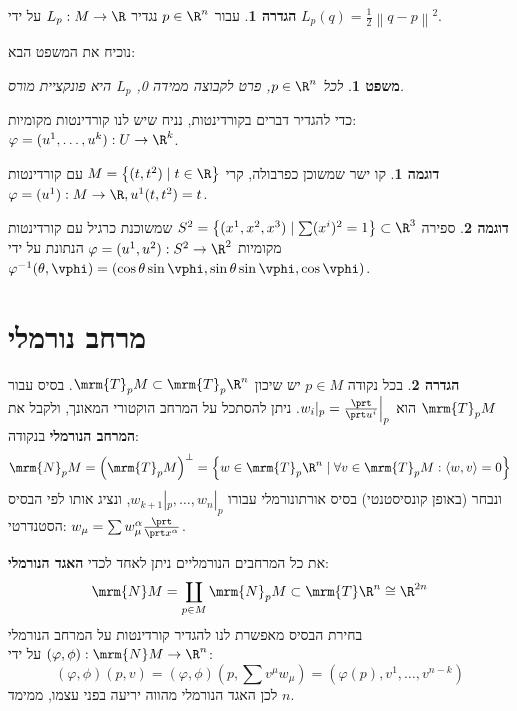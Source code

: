 \documentclass{article}
\newtheorem{theorem}{משפט}
\theoremstyle{definition}
\newtheorem*{definition*}{הגדרה}
\newtheorem*{example*}{דוגמה}
\newcommand{\norm}[1]{\left\lVert#1\right\rVert}
\begin{document}
	\begin{definition*}
		עבור
		\(p\in \R^n\)
		נגדיר
		\(L_p:M\to \R\)
		על ידי
		\(L_p(q)=\frac{1}{2}\norm{q-p}^2\).
	\end{definition*}

	נוכיח את המשפט הבא:
	\begin{theorem}\label{main-thm}
		לכל
		\(p\in \R^n\),
		פרט לקבוצה ממידה 0, \(L_p\) היא פונקציית מורס.
	\end{theorem}

	כדי להגדיר דברים בקורדינטות, נניח שיש לנו קורדינטות מקומיות:
	\(\varphi=(u^1,\dotsc,u^k): U \to \R^k\).
	
	\begin{example*}
		קו ישר שמשוכן כפרבולה, קרי
		\(M = \left\{ (t,t^2)\mid t \in \R \right\}\)
		עם קורדינטות
		\(\varphi=(u^1): M \to \R, u^1(t,t^2)=t\).
	\end{example*}
	
	\begin{example*}
		ספירה
		\(S^2 = \left\{(x^1,x^2,x^3) \mid \sum (x^i)^2 = 1 \right\} \subset \R^3 \)
		שמשוכנת כרגיל עם קורדינטות מקומיות
		\(\varphi=(u^1,u^2): S^2 \to \R^2\)
		הנתונת על ידי
		\(
			\varphi^{-1}(\theta, \vphi) = \left(
				\cos\theta \sin\vphi,
				\sin\theta \sin\vphi,
				\cos\vphi
			\right)
		\).
	\end{example*}




	\section{מרחב נורמלי}
	
	\begin{definition*}
		בכל נקודה
		$p\in M$
		יש שיכון
		\(\mrm{T}_p M \subset \mrm{T}_p \R^n\).
		בסיס עבור
		\(\mrm{T}_p M\)
		הוא
		\(w_i|_p=\frac{\prt}{\prt u^i}\Big|_p\).
		ניתן להסתכל על המרחב הוקטורי המאונך, ולקבל את \textbf{המרחב הנורמלי} בנקודה:
		\[
			\mrm{N}_p M
			= \left(\mrm{T}_p M\right)^\bot
			= \left\{
				w \in \mrm{T}_p \R^n
				\mid
				\forall v \in \mrm{T}_p M: \langle w,v \rangle=0
			\right\}
		\]
		ונבחר (באופן קונסיסטנטי) בסיס אורתונורמלי עבורו
		\(w_{k+1}|_p,\dotsc,w_{n}|_p\),
		ונציג אותו לפי הבסיס הסטנדרטי:
		\(w_\mu = \sum w^\alpha_\mu \frac{\prt}{\prt x^\alpha}\).
		
		את כל המרחבים הנורמליים ניתן לאחד לכדי \textbf{האגד הנורמלי}:
		\[
			\mrm{N} M
			= \coprod_{p \in M} \mrm{N}_p M
			\subset \mrm{T} \R^n
			\cong \R^{2n}
		\]
		בחירת הבסיס מאפשרת לנו להגדיר קורדינטות על המרחב הנורמלי
		\((\varphi,\phi): \mrm{N} M \to \R^n\)
		על ידי:
		\[
			(\varphi,\phi)(p,v)
			= (\varphi,\phi)(p,\sum v^\mu w_\mu)
			= (\varphi(p),v^1,\dotsc,v^{n-k})
		\]
		לכן האגד הנורמלי מהווה יריעה בפני עצמו, ממימד \(n\).
	\end{definition*}
\end{document}
